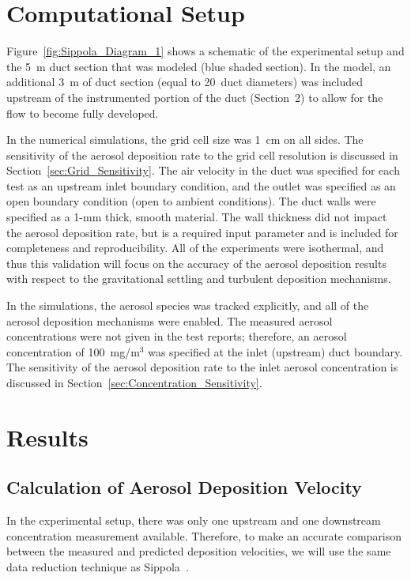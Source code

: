 \clearpage


\section{Computational Setup}
\label{sec:Computational_Setup}

Figure~\ref{fig:Sippola_Diagram_1} shows a schematic of the experimental setup and the 5~m duct section that was modeled (blue shaded section). In the model, an additional 3~m of duct section (equal to 20~duct diameters) was included upstream of the instrumented portion of the duct (Section~2) to allow for the flow to become fully developed.

In the numerical simulations, the grid cell size was 1~cm on all sides. The sensitivity of the aerosol deposition rate to the grid cell resolution is discussed in Section~\ref{sec:Grid_Sensitivity}. The air velocity in the duct was specified for each test as an upstream inlet boundary condition, and the outlet was specified as an open boundary condition (open to ambient conditions). The duct walls were specified as a 1-mm thick, smooth material. The wall thickness did not impact the aerosol deposition rate, but is a required input parameter and is included for completeness and reproducibility. All of the experiments were isothermal, and thus this validation will focus on the accuracy of the aerosol deposition results with respect to the gravitational settling and turbulent deposition mechanisms.

In the simulations, the aerosol species was tracked explicitly, and all of the aerosol deposition mechanisms were enabled. The measured aerosol concentrations were not given in the test reports; therefore, an aerosol concentration of 100~mg/m$^3$ was specified at the inlet (upstream) duct boundary. The sensitivity of the aerosol deposition rate to the inlet aerosol concentration is discussed in Section~\ref{sec:Concentration_Sensitivity}.

\section{Results}
\label{sec:Results}

\subsection{Calculation of Aerosol Deposition Velocity}

In the experimental setup, there was only one upstream and one downstream concentration measurement available. Therefore, to make an accurate comparison between the measured and predicted deposition velocities, we will use the same data reduction technique as Sippola~\cite{Sippola:2002,Sippola:2010}.

